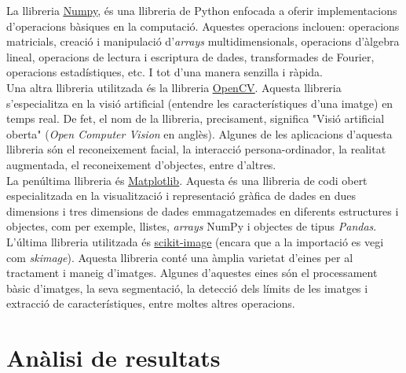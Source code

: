 \documentclass[a4paper,12pt]{report}
\begin{document}
La llibreria \href{https://numpy.org}{\underline{Numpy}}, és una llibreria de Python enfocada a oferir implementacions d'operacions bàsiques en la computació. Aquestes operacions inclouen: operacions matricials, creació i manipulació d'\textit{arrays} multidimensionals, operacions d'àlgebra lineal, operacions de lectura i escriptura de dades, transformades de Fourier, operacions estadístiques, etc. I tot d'una manera senzilla i ràpida.\\
Una altra llibreria utilitzada és la llibreria \href{https://docs.opencv.org/4.x/d6/d00/tutorial_py_root.html}{\underline{OpenCV}}. Aquesta llibreria s'especialitza en la visió artificial (entendre les característiques d'una imatge) en temps real. De fet, el nom de la llibreria, precisament, significa "Visió artificial oberta" (\textit{Open Computer Vision} en anglès). Algunes de les aplicacions d'aquesta llibreria són el reconeixement facial, la interacció persona-ordinador, la realitat augmentada, el reconeixement d'objectes, entre d'altres.\\
La penúltima llibreria és \href{https://matplotlib.org}{\underline{Matplotlib}}. Aquesta és una llibreria de codi obert especialitzada en la visualització i representació gràfica de dades en dues dimensions i tres dimensions de dades emmagatzemades en diferents estructures i objectes, com per exemple, llistes, \textit{arrays} NumPy i objectes de tipus \textit{Pandas}.\\
L'última llibreria utilitzada és \href{https://scikit-image.org}{\underline{scikit-image}} (encara que a la importació es vegi com \textit{skimage}). Aquesta llibreria conté una àmplia varietat d'eines per al tractament i maneig d'imatges. Algunes d'aquestes eines són el processament bàsic d'imatges, la seva segmentació, la detecció dels límits de les imatges i extracció de característiques, entre moltes altres operacions. 
\section*{Anàlisi de resultats}
\end{document}
